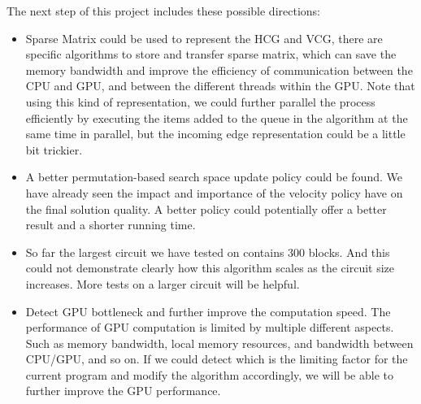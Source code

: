 \documentclass{article}
\begin{document}
The next step of this project includes these possible directions:
\begin{itemize}
    \item Sparse Matrix could be used to represent the HCG and VCG, there are specific algorithms to store and transfer sparse matrix, which can save the memory bandwidth and improve the efficiency of communication between the CPU and GPU, and between the different threads within the GPU. Note that using this kind of representation, we could further parallel the process efficiently by executing the items added to the queue in the algorithm at the same time in parallel, but the incoming edge representation could be a little bit trickier.
    \item A better permutation-based search space update policy could be found. We have already seen the impact and importance of the velocity policy have on the final solution quality. A better policy could potentially offer a better result and a shorter running time.
    \item So far the largest circuit we have tested on contains 300 blocks. And this could not demonstrate clearly how this algorithm scales as the circuit size increases. More tests on a larger circuit will be helpful.
    \item Detect GPU bottleneck and further improve the computation speed. The performance of GPU computation is limited by multiple different aspects. Such as memory bandwidth, local memory resources, and bandwidth between CPU/GPU, and so on. If we could detect which is the limiting factor for the current program and modify the algorithm accordingly, we will be able to further improve the GPU performance. 
\end{itemize}



\end{document}
